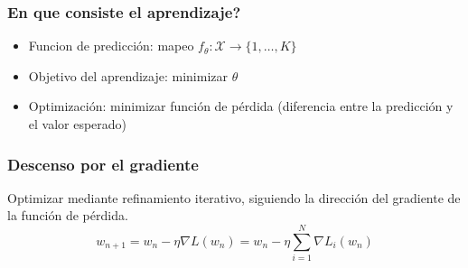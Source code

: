 \documentclass[12pt,center]{beamer}
\begin{document}
\begin{frame}
  \frametitle{En que consiste el aprendizaje?}
  \begin{itemize}
    \item Funcion de predicción: mapeo $f_{\theta}: \mathcal{X} {\rightarrow} \{1,\dots,K\}$
    \item Objetivo del aprendizaje: minimizar $\theta$
    \item Optimización: minimizar función de pérdida (diferencia entre la predicción y el valor esperado)
  \end{itemize}
\end{frame}

\begin{frame}
  \frametitle{Descenso por el gradiente}
    Optimizar mediante refinamiento iterativo, siguiendo la dirección del gradiente de la función de pérdida.
    \begin{equation}
      w_{n+1} = w_n - \eta \nabla L(w_n)  = w_n - \eta \sum_{i=1}^{N} \nabla L_i(w_n)
    \end{equation}
\end{frame}
\end{document}
